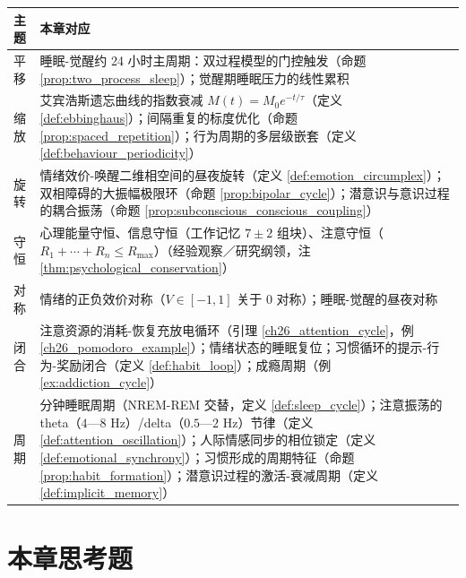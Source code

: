 \begin{center}
\begin{tabular}{>{\centering\arraybackslash}p{2.2cm}>{\centering\arraybackslash}p{10.5cm}}
\toprule
主题 & 本章对应 \\
\midrule
平移 & 睡眠-觉醒约 24 小时主周期：双过程模型的门控触发（命题 \ref{prop:two_process_sleep}）；觉醒期睡眠压力的线性累积 \\
缩放 & 艾宾浩斯遗忘曲线的指数衰减 $M(t) = M_0 e^{-t/\tau}$（定义 \ref{def:ebbinghaus}）；间隔重复的标度优化（命题 \ref{prop:spaced_repetition}）；行为周期的多层级嵌套（定义 \ref{def:behaviour_periodicity}） \\
旋转 & 情绪效价-唤醒二维相空间的昼夜旋转（定义 \ref{def:emotion_circumplex}）；双相障碍的大振幅极限环（命题 \ref{prop:bipolar_cycle}）；潜意识与意识过程的耦合振荡（命题 \ref{prop:subconscious_conscious_coupling}） \\
守恒 & 心理能量守恒、信息守恒（工作记忆 $7\pm2$ 组块）、注意守恒（$R_1+\cdots+R_n \le R_{\max}$）（经验观察／研究纲领，注 \ref{thm:psychological_conservation}） \\
对称 & 情绪的正负效价对称（$V \in [-1,1]$ 关于 $0$ 对称）；睡眠-觉醒的昼夜对称 \\
闭合 & 注意资源的消耗-恢复充放电循环（引理 \ref{ch26_attention_cycle}，例 \ref{ch26_pomodoro_example}）；情绪状态的睡眠复位；习惯循环的提示-行为-奖励闭合（定义 \ref{def:habit_loop}）；成瘾周期（例 \ref{ex:addiction_cycle}） \\
周期 & 90 分钟睡眠周期（NREM-REM 交替，定义 \ref{def:sleep_cycle}）；注意振荡的 theta（$4$—$8$ Hz）/delta（$0.5$—$2$ Hz）节律（定义 \ref{def:attention_oscillation}）；人际情感同步的相位锁定（定义 \ref{def:emotional_synchrony}）；习惯形成的周期特征（命题 \ref{prop:habit_formation}）；潜意识过程的激活-衰减周期（定义 \ref{def:implicit_memory}） \\
\bottomrule
\end{tabular}
\end{center}

\section*{本章思考题}

